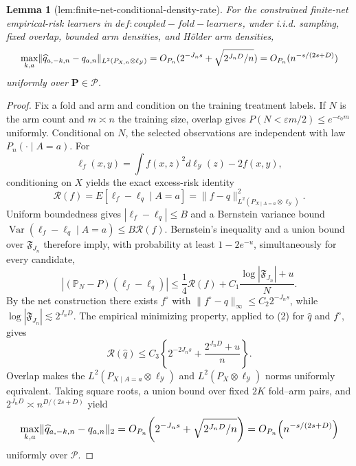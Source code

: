 \documentclass{article}
\newtheorem{lemma}{Lemma}
\begin{document}
\begin{lemma}[lem:finite-net-conditional-density-rate]\label{lem:finite-net-conditional-density-rate}
For the constrained finite-net empirical-risk learners in \(def:coupled-fold-learners\), under i.i.d. sampling, fixed overlap, bounded arm densities, and Hölder arm densities,
\[
\makebox[\linewidth][c]{\resizebox{0.98\linewidth}{!}{\par\noindent \makebox[\linewidth][c]{\resizebox{0.98\linewidth}{!}{\(\displaystyle \displaystyle \max_{k,a}\lVert\widehat q_{a,-k,n}-q_{a,n}\rVert_{L^2(P_{X,n}\otimes\ell_{\mathcal Y})}=O_{P_n}(2^{-J_ns}+\sqrt{2^{J_nD}/n})=O_{P_n}(n^{-s/(2s+D)})\)}}\par\noindent}}
\]uniformly over \(\mathbf P\in\mathscr P\).
\end{lemma}
\begin{proof}
Fix a fold and arm and condition on the training treatment labels. If \(N\) is the arm count and \(m\asymp n\) the training size, overlap gives \(P(N<\varepsilon m/2)\le e^{-c_0m}\) uniformly. Conditional on \(N\), the selected observations are independent with law \(P_n(\cdot\mid A=a)\). For
\[\ell_f(x,y)=\int f(x,z)^2d\ell_{\mathcal Y}(z)-2f(x,y),\]
conditioning on \(X\) yields the exact excess-risk identity
\[\mathcal R(f)=E[\ell_f-\ell_q\mid A=a]=\lVert f-q\rVert_{L^2(P_{X\mid A=a}\otimes\ell_{\mathcal Y})}^2.\tag{1}\]
Uniform boundedness gives \(|\ell_f-\ell_q|\le B\) and a Bernstein variance bound \(\operatorname{Var}(\ell_f-\ell_q\mid A=a)\le B\mathcal R(f)\). Bernstein's inequality and a union bound over \(\mathfrak F_{J_n}\) therefore imply, with probability at least \(1-2e^{-u}\), simultaneously for every candidate,
\[|({\mathbb P}_N-P)(\ell_f-\ell_q)|\le\frac14\mathcal R(f)+C_1\frac{\log|\mathfrak F_{J_n}|+u}{N}.\tag{2}\]
By the net construction there exists \(f^\circ\) with \(\lVert f^\circ-q\rVert_\infty\le C_2 2^{-J_ns}\), while \(\log|\mathfrak F_{J_n}|\lesssim2^{J_nD}\). The empirical minimizing property, applied to (2) for \(\widehat q\) and \(f^\circ\), gives
\[\mathcal R(\widehat q)\le C_3\left\{2^{-2J_ns}+\frac{2^{J_nD}+u}{n}\right\}.\tag{3}\]
Overlap makes the \(L^2(P_{X\mid A=a}\otimes\ell_{\mathcal Y})\) and \(L^2(P_X\otimes\ell_{\mathcal Y})\) norms uniformly equivalent. Taking square roots, a union bound over fixed \(2K\) fold--arm pairs, and \(2^{J_nD}\asymp n^{D/(2s+D)}\) yield
\[
\makebox[\linewidth][c]{\resizebox{0.98\linewidth}{!}{\par\noindent \makebox[\linewidth][c]{\resizebox{0.98\linewidth}{!}{\(\displaystyle \displaystyle \max_{k,a}\lVert\widehat q_{a,-k,n}-q_{a,n}\rVert_2=O_{P_n}\!\left(2^{-J_ns}+\sqrt{2^{J_nD}/n}\right)=O_{P_n}\!\left(n^{-s/(2s+D)}\right)\)}}\par\noindent}}
\]
uniformly over \(\mathscr P\).
\end{proof}
\end{document}
